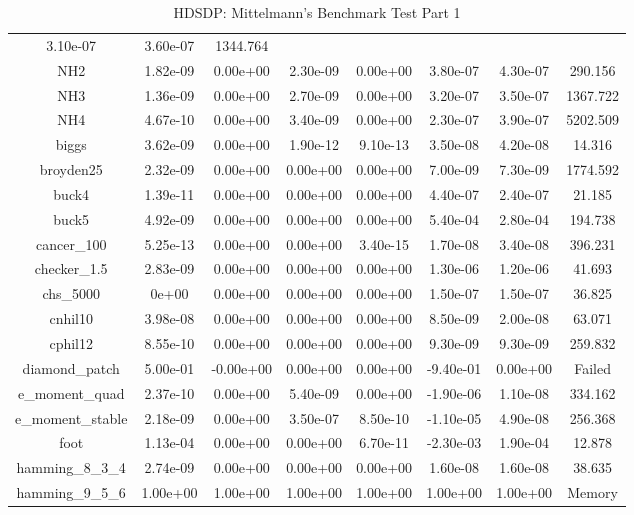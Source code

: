 {{\begin{table}[h]
\begin{center}
{\begin{tabular}{cccccccc}
      3.10e-07 & 3.60e-07 & 1344.764\\
      NH2 & 1.82e-09 & 0.00e+00 & 2.30e-09 & 0.00e+00 &
      3.80e-07 & 4.30e-07 & 290.156\\
      NH3 & 1.36e-09 & 0.00e+00 & 2.70e-09 & 0.00e+00 &
      3.20e-07 & 3.50e-07 & 1367.722\\
      NH4 & 4.67e-10 & 0.00e+00 & 3.40e-09 & 0.00e+00 &
      2.30e-07 & 3.90e-07 & 5202.509\\
      biggs & 3.62e-09 & 0.00e+00 & 1.90e-12 & 9.10e-13 &
      3.50e-08 & 4.20e-08 & 14.316\\
      broyden25 & 2.32e-09 & 0.00e+00 & 0.00e+00 & 0.00e+00 &
      7.00e-09 & 7.30e-09 & 1774.592\\
      buck4 & 1.39e-11 & 0.00e+00 & 0.00e+00 & 0.00e+00 &
      4.40e-07 & 2.40e-07 & 21.185\\
      buck5 & 4.92e-09 & 0.00e+00 & 0.00e+00 & 0.00e+00 &
      5.40e-04 & 2.80e-04 & 194.738\\
      cancer\_100 & 5.25e-13 & 0.00e+00 & 0.00e+00 & 3.40e-15 &
      1.70e-08 & 3.40e-08 & 396.231\\
      checker\_1.5 & 2.83e-09 & 0.00e+00 & 0.00e+00 & 0.00e+00 &
      1.30e-06 & 1.20e-06 & 41.693\\
      chs\_5000 & 0e+00 & 0.00e+00 & 0.00e+00 & 0.00e+00 &
      1.50e-07 & 1.50e-07 & 36.825\\
      cnhil10 & 3.98e-08 & 0.00e+00 & 0.00e+00 & 0.00e+00 &
      8.50e-09 & 2.00e-08 & 63.071\\
      cphil12 & 8.55e-10 & 0.00e+00 & 0.00e+00 & 0.00e+00 &
      9.30e-09 & 9.30e-09 & 259.832\\
      diamond\_patch & 5.00e-01 & -0.00e+00 & 0.00e+00 & 0.00e+00
      & -9.40e-01 & 0.00e+00 & Failed\\
      e\_moment\_quad & 2.37e-10 & 0.00e+00 & 5.40e-09 &
      0.00e+00 & -1.90e-06 & 1.10e-08 & 334.162\\
      e\_moment\_stable & 2.18e-09 & 0.00e+00 & 3.50e-07 &
      8.50e-10 & -1.10e-05 & 4.90e-08 & 256.368\\
      foot & 1.13e-04 & 0.00e+00 & 0.00e+00 & 6.70e-11 &
      -2.30e-03 & 1.90e-04 & 12.878\\
      hamming\_8\_3\_4 & 2.74e-09 & 0.00e+00 & 0.00e+00 &
      0.00e+00 & 1.60e-08 & 1.60e-08 & 38.635\\
      hamming\_9\_5\_6 & 1.00e+00 & 1.00e+00 & 1.00e+00 & 1.00e+00
      & 1.00e+00 & 1.00e+00 & Memory\\
      \bottomrule
    \end{tabular}
  }  
\end{center}
  \caption{HDSDP: Mittelmann's Benchmark Test Part 1}
\end{table}}}

